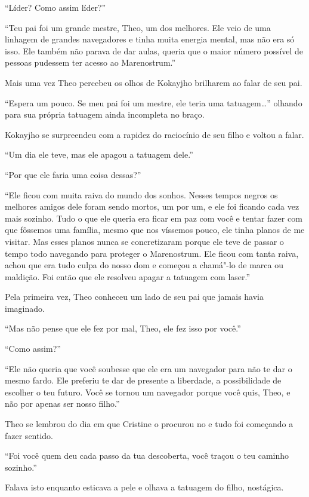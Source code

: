 ``Líder? Como assim líder?''

``Teu pai foi um grande mestre, Theo, um dos melhores. Ele veio de uma
linhagem de grandes navegadores e tinha muita energia mental, mas não
era só isso. Ele também não parava de dar aulas, queria que o maior
número possível de pessoas pudessem ter acesso ao Marenostrum.''

Mais uma vez Theo percebeu os olhos de Kokayjho brilharem ao falar de
seu pai.

``Espera um pouco. Se meu pai foi um mestre, ele teria uma tatuagem\ldots{}''
olhando para sua própria tatuagem ainda incompleta no braço.

Kokayjho se surpreendeu com a rapidez do raciocínio de seu filho e
voltou a falar.

``Um dia ele teve, mas ele apagou a tatuagem dele.''

``Por que ele faria uma coisa dessas?''

``Ele ficou com muita raiva do mundo dos sonhos. Nesses tempos negros os
melhores amigos dele foram sendo mortos, um por um, e ele foi ficando
cada vez mais sozinho. Tudo o que ele queria era ficar em paz com você e
tentar fazer com que fôssemos uma família, mesmo que nos víssemos pouco,
ele tinha planos de me visitar. Mas esses planos nunca se concretizaram
porque ele teve de passar o tempo todo navegando para proteger o
Marenostrum. Ele ficou com tanta raiva, achou que era tudo culpa do
nosso dom e começou a chamá"-lo de marca ou maldição. Foi então que ele
resolveu apagar a tatuagem com laser.''

Pela primeira vez, Theo conheceu um lado de seu pai que jamais havia
imaginado.

``Mas não pense que ele fez por mal, Theo, ele fez isso por você.''

``Como assim?''

``Ele não queria que você soubesse que ele era um navegador para não te
dar o mesmo fardo. Ele preferiu te dar de presente a liberdade, a
possibilidade de escolher o teu futuro. Você se tornou um navegador
porque você quis, Theo, e não por apenas ser nosso filho.''

Theo se lembrou do dia em que Cristine o procurou no  e tudo foi
começando a fazer sentido.

``Foi você quem deu cada passo da tua descoberta, você traçou o teu
caminho sozinho.''

Falava isto enquanto esticava a pele e olhava a tatuagem do filho,
nostágica.

